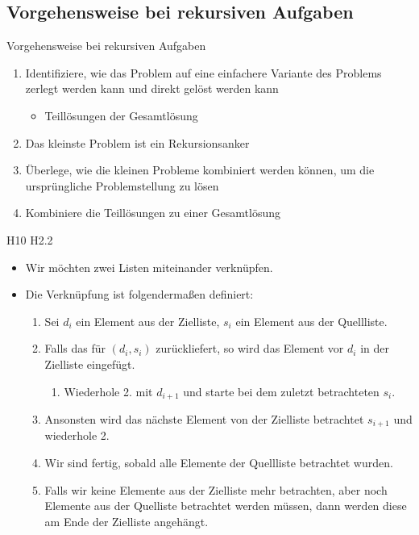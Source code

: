 \documentclass{../tuda-beamer}
\begin{document}
    \subsection{Vorgehensweise bei rekursiven Aufgaben}
    \label{subsec:recursion-approach}
    \begin{frame}[c]{Vorgehensweise bei rekursiven Aufgaben}
        \begin{enumerate}
            \item Identifiziere, wie das Problem auf eine einfachere Variante des Problems
            zerlegt werden kann und direkt gelöst werden kann

            \begin{itemize}
                \item Teillösungen der Gesamtlösung
            \end{itemize}
            \item Das kleinste Problem ist ein Rekursionsanker
            \item Überlege, wie die kleinen Probleme kombiniert werden können, um die
            ursprüngliche Problemstellung zu lösen
            \item Kombiniere die Teillösungen zu einer Gesamtlösung
        \end{enumerate}
    \end{frame}

    \begin{frame}[c]{H10 H2.2}
        \begin{itemize}
            \item Wir möchten zwei Listen miteinander verknüpfen.
            \item Die Verknüpfung ist folgendermaßen definiert:
            \begin{enumerate}
                \item Sei \(d_i\) ein Element aus der Zielliste, \(s_i\) ein Element aus der
                Quellliste.
                \item Falls das  für \((d_i, s_i)\) 
                zurückliefert, so wird das Element vor \(d_i\) in der Zielliste eingefügt.
                \begin{enumerate}
                    \item Wiederhole 2. mit \(d_{i + 1}\) und starte bei dem zuletzt
                    betrachteten \(s_i\).
                \end{enumerate}
                \item Ansonsten wird das nächste Element von der Zielliste betrachtet \(s_{i +
                1}\) und wiederhole 2.
                \item Wir sind fertig, sobald alle Elemente der Quellliste betrachtet wurden.
                \item Falls wir keine Elemente aus der Zielliste mehr betrachten, aber noch
                Elemente aus der Quelliste betrachtet werden müssen, dann werden diese am Ende
                der Zielliste angehängt.
            \end{enumerate}
        \end{itemize}
    \end{frame}
\end{document}
